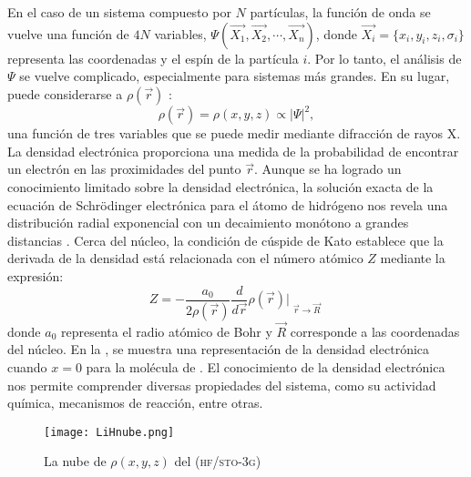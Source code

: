 	En el caso de un sistema compuesto por $N$ partículas, la función de onda se vuelve una función
  de $4N$ variables, $\Psi(\vec{X_1}, \vec{X_2}, \cdots, \vec{X_n})$, donde $\vec{X_i} = 
  \{x_i,y_i,z_i,\sigma_i\}$ representa las coordenadas y el espín de la partícula $i$. Por lo 
  tanto, el análisis de $\Psi$ se vuelve complicado, especialmente para sistemas más grandes. 
  En su lugar, puede considerarse a $\rho(\vec{r})$ :
  \begin{equation*}
			\rho(\vec{r}) = \rho(x,y,z) \propto |\Psi|^2,
	\end{equation*}
  una función de tres variables que se puede medir mediante difracción de rayos X. La densidad 
	electrónica proporciona una medida de la probabilidad de encontrar un electrón en las proximidades del 
	punto $\vec{r}$. Aunque se ha logrado un conocimiento limitado sobre la densidad electrónica, la solución 
		exacta de la ecuación de Schrödinger electrónica para el átomo de hidrógeno nos revela una distribución radial
		exponencial con un decaimiento monótono a grandes distancias \cite{decayalhrichs} \cite{hoffmannh2}. Cerca del núcleo, 
		la condición de cúspide de Kato \cite{kato57} establece que la derivada de la densidad está relacionada con el número
	   atómico $Z$ mediante la expresión:
	  \begin{equation}
			Z = - \frac{a_0}{2\rho(\vec{r})}
			\frac{d}{d\vec{r}}
			\rho(\vec{r})
			\Biggr|_{\substack{\vec{r} \rightarrow \vec{R}}}
		\end{equation}
	donde $a_0$ representa el radio atómico de Bohr y $\vec{R}$ corresponde a las coordenadas del núcleo. En la , 
	se muestra una representación de la 	densidad electrónica cuando $x=0$ para la molécula de . El conocimiento de 
	la densidad electrónica nos permite comprender diversas propiedades del sistema, como su actividad química, mecanismos de reacción, 
	entre otras.
	\begin{figure} [h!]
		\centering
		\texttt{[image: LiHnube.png]}
		\caption{La nube de $\rho(x,y,z)$ del  (\textsc{hf/sto-3g})}
		\label{fig:LiHnube}
	\end{figure}
